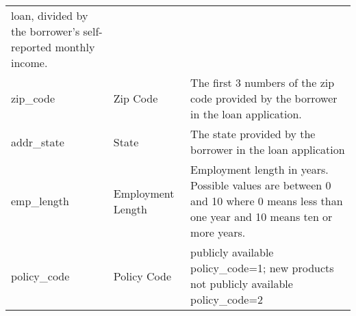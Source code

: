 \documentclass[11pt]{article}
\begin{document}
\begin{longtable}[]{@{}lll@{}}
\begin{minipage}[t]{0.6\columnwidth}
loan, divided by the borrower's self-reported monthly income.\strut
\end{minipage}\tabularnewline
\begin{minipage}[t]{0.15\columnwidth}\raggedright\strut
zip\_code\strut
\end{minipage} & \begin{minipage}[t]{0.16\columnwidth}\raggedright\strut
Zip Code\strut
\end{minipage} & \begin{minipage}[t]{0.6\columnwidth}\raggedright\strut
The first 3 numbers of the zip code provided by the borrower in the loan
application.\strut
\end{minipage}\tabularnewline
\begin{minipage}[t]{0.15\columnwidth}\raggedright\strut
addr\_state\strut
\end{minipage} & \begin{minipage}[t]{0.16\columnwidth}\raggedright\strut
State\strut
\end{minipage} & \begin{minipage}[t]{0.6\columnwidth}\raggedright\strut
The state provided by the borrower in the loan application\strut
\end{minipage}\tabularnewline
\begin{minipage}[t]{0.15\columnwidth}\raggedright\strut
emp\_length\strut
\end{minipage} & \begin{minipage}[t]{0.16\columnwidth}\raggedright\strut
Employment Length\strut
\end{minipage} & \begin{minipage}[t]{0.6\columnwidth}\raggedright\strut
Employment length in years. Possible values are between 0 and 10 where 0
means less than one year and 10 means ten or more years.\strut
\end{minipage}\tabularnewline
\begin{minipage}[t]{0.15\columnwidth}\raggedright\strut
policy\_code\strut
\end{minipage} & \begin{minipage}[t]{0.16\columnwidth}\raggedright\strut
Policy Code\strut
\end{minipage} & \begin{minipage}[t]{0.6\columnwidth}\raggedright\strut
publicly available policy\_code=1; new products not publicly available
policy\_code=2\strut
\end{minipage}\tabularnewline
\bottomrule
\end{longtable}
\end{document}
